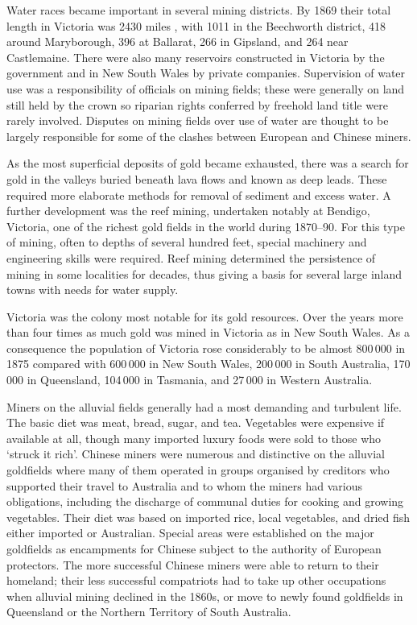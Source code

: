 Water races became important in several mining districts.  By 1869
their total length in Victoria was 2430 miles , with 1011 in the
Beechworth district, 418 around Maryborough, 396 at Ballarat, 266 in
Gipsland, and 264 near Castlemaine.  There were also many reservoirs
constructed in Victoria by the government and in New South Wales by
private companies.  Supervision of water use was a responsibility of
officials on mining fields; these were generally on land still held by
the crown so riparian rights conferred by freehold land title were
rarely involved.  Disputes on mining fields over use of water are
thought to be largely responsible for some of the clashes between
European and Chinese miners.

As the most superficial deposits of gold became exhausted, there was a
search for gold in the valleys buried beneath lava flows and known as
deep leads.  These required more elaborate methods for removal of
sediment and excess water.  A further development was the reef mining,
undertaken notably at Bendigo, Victoria, one of the richest gold
fields in the world during 1870--90.  For this type of mining, often
to depths of several hundred feet, special machinery and engineering
skills were required.  Reef mining determined the persistence of
mining in some localities for decades, thus giving a basis for several
large inland towns with needs for water supply.

Victoria was the colony most notable for its gold resources.  Over the
years more than four times as much gold was mined in Victoria as in
New South Wales.  As a consequence the population of Victoria rose
considerably to be almost 800\,000 in 1875 compared with 600\,000 in
New South Wales, 200\,000 in South Australia, 170\,000 in Queensland,
104\,000 in Tasmania, and 27\,000 in Western Australia.

Miners on the alluvial fields generally had a most demanding and
turbulent life.  The basic diet was meat, bread, sugar, and tea.
Vegetables were expensive if available at all, though many imported
luxury foods were sold to those who `struck it rich'.  Chinese miners
were numerous and distinctive on the alluvial goldfields where many of
them operated in groups organised by creditors who supported their
travel to Australia and to whom the miners had various obligations,
including the discharge of communal duties for cooking and growing
vegetables.  Their diet was based on imported rice, local vegetables,
and dried fish either imported or Australian.  Special areas were
established on the major goldfields as encampments for Chinese subject
to the authority of European protectors.  The more successful Chinese
miners were able to return to their homeland; their less successful
compatriots had to take up other occupations when alluvial mining
declined in the 1860s, or move to newly found goldfields in Queensland
or the Northern Territory of South
Australia.

